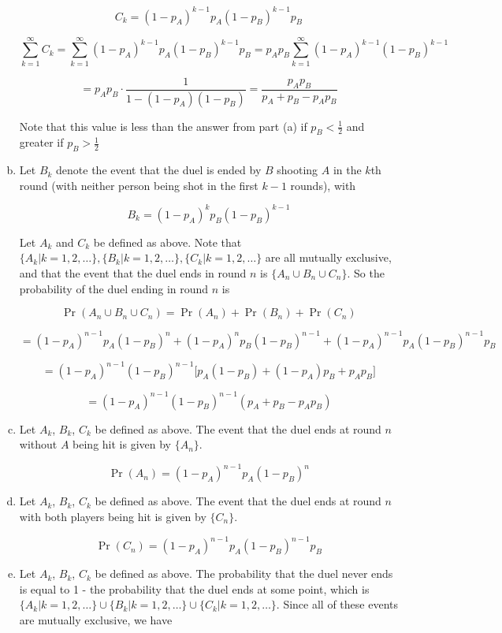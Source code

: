 \begin{enumerate}[(a)]
\[
C_k = (1 - p_A)^{{k-1}}p_A(1 - p_B)^{k-1}p_B
\]

\[
\sum_{k=1}^\infty C_k = \sum_{k=1}^\infty (1 - p_A)^{{k-1}}p_A(1 - p_B)^{k-1}p_B = p_A p_B\sum_{k=1}^\infty (1 - p_A)^{{k-1}}(1 - p_B)^{k-1} 
\]

\[
= p_A p_B \cdot \frac{1}{1 - (1 - p_A)(1 - p_B)} = \boxed{ \frac{p_A p_B }{p_A + p_B - p_Ap_B} }
\]

Note that this value is less than the answer from part (a) if \(p_B < \frac{1}{2}\) and greater if \(p_B > \frac{1}{2}\)

\item Let \(B_k\) denote the event that the duel is ended by \(B\) shooting \(A\) in the \(k\)th round (with neither person being shot in the first \(k - 1\) rounds), with

\[
B_k = (1 - p_A)^{{k}}p_B(1 - p_B)^{k-1}
\]

Let \(A_k\) and \(C_k\) be defined as above. Note that \(\{A_k | k = 1, 2, \ldots\} , \{B_k | k = 1, 2, \ldots\}, \{C_k | k = 1, 2, \ldots\}\) are all mutually exclusive, and that the event that the duel ends in round \(n\) is \(\{A_n \cup B_n \cup C_n\}\). So the probability of the duel ending in round \(n\) is

\[
\Pr(A_n \cup B_n \cup C_n) = \Pr(A_n) + \Pr(B_n) + \Pr(C_n) 
\]

\[
= (1 - p_A)^{n-1}p_A(1 - p_B)^{n} + (1 - p_A)^{{n}}p_B(1 - p_B)^{n-1} + (1 - p_A)^{{n-1}}p_A(1 - p_B)^{n-1}p_B
\]

\[
= (1 - p_A)^{n-1}(1 - p_B)^{n-1} \big[p_A(1 - p_B) + (1 - p_A)p_B + p_Ap_B \big]
\]

\[
= \boxed{(1 - p_A)^{n-1}(1 - p_B)^{n-1} (p_A + p_B - p_Ap_B )}
\]

\item Let \(A_k\), \(B_k\), \(C_k\) be defined as above. The event that the duel ends at round \(n\) without \(A\) being hit is given by \(\{ A_n\} \). 

\[
\Pr(A_n) = \boxed{(1 - p_A)^{{n-1}}p_A(1 - p_B)^{n}}
\]

\item Let \(A_k\), \(B_k\), \(C_k\) be defined as above. The event that the duel ends at round \(n\) with both players being hit is given by \(\{ C_n\} \). 

\[
\Pr(C_n) = \boxed{(1 - p_A)^{{n-1}}p_A(1 - p_B)^{n-1}p_B}
\]

\item Let \(A_k\), \(B_k\), \(C_k\) be defined as above. The probability that the duel never ends is equal to 1 - the probability that the duel ends at some point, which is  \(\{A_k | k = 1, 2, \ldots\} \cup \{B_k | k = 1, 2, \ldots\} \cup \{C_k | k = 1, 2, \ldots\}\). Since all of these events are mutually exclusive, we have


\end{enumerate}
